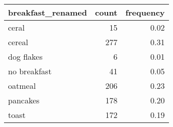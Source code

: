\begin{table}[!h]
\centering
\begin{tabular}[t]{lrr}
\toprule
breakfast\_renamed & count & frequency\\
\midrule
ceral & 15 & 0.02\\
cereal & 277 & 0.31\\
dog flakes & 6 & 0.01\\
no breakfast & 41 & 0.05\\
oatmeal & 206 & 0.23\\
\addlinespace
pancakes & 178 & 0.20\\
toast & 172 & 0.19\\
\bottomrule
\end{tabular}
\end{table}
